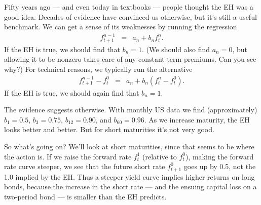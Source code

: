 \documentclass[11pt]{article}
\begin{document}
Fifty years ago --- and even today in textbooks --- people thought the EH was a good idea.
Decades of evidence have convinced us otherwise, but it's still a useful benchmark.
We can get a sense of its weaknesses by running the regression
\begin{eqnarray*}
    f^{n-1}_{t+1} &=& a_n + b_n f^n_t .
\end{eqnarray*}
If the EH is true, we should find that $b_n = 1$.
(We should also find $a_n=0$, but allowing it to be nonzero
takes care of any constant term premiums.
Can you see why?)
For technical reasons, we typically run the alternative
\begin{eqnarray}
    f^{n-1}_{t+1} - f^0_t &=& a_n + b_n (f^n_t - f^0_t) .
    \label{eq:forward-regressions}
\end{eqnarray}
If the EH is true, we should again find that $b_n = 1$.

The evidence suggests otherwise.
With monthly US data we find (approximately) $b_1 = 0.5$, $b_3 = 0.75$,
$b_{12} = 0.90$, and $b_{60} = 0.96$.
As we increase maturity, the EH looks better and better.
But for short maturities it's not very good.

So what's going on?
We'll look at short maturities, since that seems to be where the action is.
If we raise the forward rate $f^1_t$ (relative to $f^0_t$),
making the forward rate curve steeper,
we see that the future short rate $f^0_{t+1}$ goes up by 0.5,
not the 1.0 implied by the EH.
Thus a steeper yield curve implies higher returns on long bonds, because the
increase in the short rate --- and the ensuing capital loss on a two-period bond ---
is smaller than the EH predicts.
\end{document}
